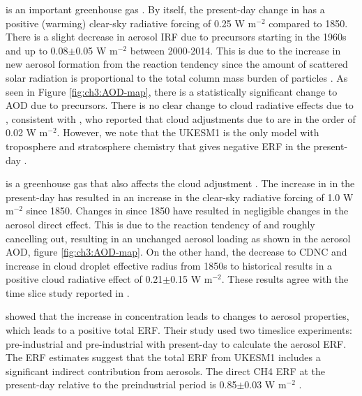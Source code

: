  is an important greenhouse gas \citep{forsterEarthEnergyBudget2021}. By itself, the present-day change in  has a positive (warming) clear-sky radiative forcing of 0.25 W m$^{-2}$ compared to 1850. There is a slight decrease in aerosol IRF due to  precursors starting in the 1960s and up to 0.08$\pm$0.05 W m$^{-2}$ between 2000-2014. This is due to the increase in new aerosol formation from the  reaction tendency since the amount of scattered solar radiation is proportional to the total column mass burden of particles \citep{nemesureDirectShortwaveForcing1995}. As seen in Figure \ref{fig:ch3:AOD-map}, there is a statistically significant change to AOD due to  precursors. There is no clear change to cloud radiative effects due to , consistent with \citet{skeieHistoricalTotalOzone2020}, who reported that cloud adjustments due to  are in the order of 0.02 W m$^{-2}$. However, we note that the UKESM1 is the only model with troposphere and stratosphere chemistry that gives negative ERF in the present-day \citet{skeieHistoricalTotalOzone2020}. 

 is a greenhouse gas that also affects the cloud adjustment \citep{oconnorApportionmentPreIndustrial2022}. The increase in  in the present-day has resulted in an increase in the clear-sky radiative forcing of 1.0 W m$^{-2}$ since 1850. Changes in  since 1850 have resulted in negligible changes in the aerosol direct effect. This is due to the reaction tendency of  and  roughly cancelling out, resulting in an unchanged aerosol loading as shown in the aerosol AOD, figure \ref{fig:ch3:AOD-map}. On the other hand, the decrease to CDNC and increase in cloud droplet effective radius from 1850s to historical  results in a positive cloud radiative effect of 0.21$\pm$0.15 W m$^{-2}$. These results agree with the time slice study reported in \citep{oconnorApportionmentPreIndustrial2022}.

\citet{oconnorApportionmentPreIndustrial2022} showed that the increase in  concentration leads to changes to aerosol properties, which leads to a positive total  ERF. Their study used two timeslice experiments: pre-industrial and pre-industrial with present-day  to calculate the aerosol ERF. The ERF estimates suggest that the total  ERF from UKESM1 includes a significant indirect contribution from aerosols. The direct CH4 ERF at the present-day relative to the preindustrial period is 0.85$\pm$0.03 W m$^{-2}$ \citep{oconnorAssessmentPreindustrialPresentday2021}.


